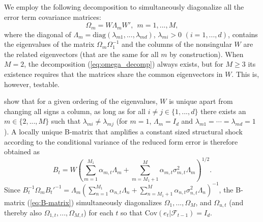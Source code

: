 \documentclass[nojss]{jss} %
\begin{document}
We employ the following decomposition to simultaneously diagonalize all the error term covariance matrices:
\begin{equation}\label{eq:omega_decomp}
\Omega_m = W\Lambda_mW',  \ \ m=1,...,M,
\end{equation}
where the diagonal of $\Lambda_m = \text{diag}(\lambda_{m1},...,\lambda_{md})$,  $\lambda_{mi}>0$ $(i=1,...,d)$,  contains the eigenvalues of the matrix $\Omega_m\Omega_1^{-1}$ and the columns of the nonsingular $W$ are the related eigenvectors (that are the same for all $m$ by construction).  When $M=2$,  the decomposition (\ref{eq:omega_decomp}) always exists, but for $M\geq 3$ its existence requires that the matrices share the common eigenvectors in $W$.  This is, however, testable.

\citet[Proposition 1]{Lanne+Lutkepohl+Maciejowska:2010} show that for a given ordering of the eigenvalues, $W$ is unique apart from changing all signs a column, as long as for all $i\neq j\in \lbrace 1,...,d \rbrace$ there exists an $m\in\lbrace 2,...,M \rbrace$ such that $\lambda_{mi}\neq\lambda_{mj}$ (for $m=1$,  $\Lambda_m=I_d$ and $\lambda_{m1}=\cdots = \lambda_{md}=1$).  A locally unique B-matrix that amplifies a constant sized structural shock according to the conditional variance of the reduced form error is therefore obtained as
\begin{equation}\label{eq:B-matrix}
B_t = W(\sum_{m=1}^{M_1}\alpha_{m,t}\Lambda_m + \sum_{m=M_1 + 1}^{M}\alpha_{m,t}\sigma_{m,t}^2\Lambda_m)^{1/2}.
\end{equation}
Since $B_t^{-1}\Omega_mB_t'^{-1}=\Lambda_m(\sum_{n=1}^{M_1}\alpha_{n,t}\Lambda_n + \sum_{n=M_1+1}^M\alpha_{n,t}\sigma_{n,t}^2\Lambda_n)^{-1}$,  the B-matrix (\ref{eq:B-matrix}) simultaneously diagonalizes $\Omega_{1},...,\Omega_{M}$, and $\Omega_{u,t}$ (and thereby also $\Omega_{1,t},...,\Omega_{M,t}$) for each $t$ so that $\text{Cov}(e_t|\mathcal{F}_{t-1}) = I_d$.
\end{document}
